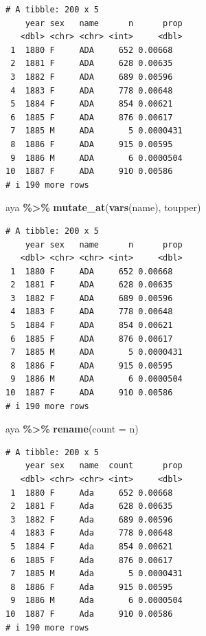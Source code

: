 \documentclass[
]{book}
\newenvironment{Shaded}{\begin{snugshade}}{\end{snugshade}}
\newcommand{\AttributeTok}[1]{\textcolor[rgb]{0.13,0.29,0.53}{#1}}
\newcommand{\FunctionTok}[1]{\textcolor[rgb]{0.13,0.29,0.53}{\textbf{#1}}}
\newcommand{\NormalTok}[1]{#1}
\newcommand{\SpecialCharTok}[1]{\textcolor[rgb]{0.81,0.36,0.00}{\textbf{#1}}}
\begin{document}
\begin{verbatim}
# A tibble: 200 x 5
    year sex   name      n      prop
   <dbl> <chr> <chr> <int>     <dbl>
 1  1880 F     ADA     652 0.00668  
 2  1881 F     ADA     628 0.00635  
 3  1882 F     ADA     689 0.00596  
 4  1883 F     ADA     778 0.00648  
 5  1884 F     ADA     854 0.00621  
 6  1885 F     ADA     876 0.00617  
 7  1885 M     ADA       5 0.0000431
 8  1886 F     ADA     915 0.00595  
 9  1886 M     ADA       6 0.0000504
10  1887 F     ADA     910 0.00586  
# i 190 more rows
\end{verbatim}

\begin{Shaded}
\begin{Highlighting}[]
\NormalTok{aya }\SpecialCharTok{\%\textgreater{}\%} \FunctionTok{mutate\_at}\NormalTok{(}\FunctionTok{vars}\NormalTok{(name), toupper)}
\end{Highlighting}
\end{Shaded}

\begin{verbatim}
# A tibble: 200 x 5
    year sex   name      n      prop
   <dbl> <chr> <chr> <int>     <dbl>
 1  1880 F     ADA     652 0.00668  
 2  1881 F     ADA     628 0.00635  
 3  1882 F     ADA     689 0.00596  
 4  1883 F     ADA     778 0.00648  
 5  1884 F     ADA     854 0.00621  
 6  1885 F     ADA     876 0.00617  
 7  1885 M     ADA       5 0.0000431
 8  1886 F     ADA     915 0.00595  
 9  1886 M     ADA       6 0.0000504
10  1887 F     ADA     910 0.00586  
# i 190 more rows
\end{verbatim}

\begin{Shaded}
\begin{Highlighting}[]
\NormalTok{aya }\SpecialCharTok{\%\textgreater{}\%} \FunctionTok{rename}\NormalTok{(}\AttributeTok{count =}\NormalTok{ n)}
\end{Highlighting}
\end{Shaded}

\begin{verbatim}
# A tibble: 200 x 5
    year sex   name  count      prop
   <dbl> <chr> <chr> <int>     <dbl>
 1  1880 F     Ada     652 0.00668  
 2  1881 F     Ada     628 0.00635  
 3  1882 F     Ada     689 0.00596  
 4  1883 F     Ada     778 0.00648  
 5  1884 F     Ada     854 0.00621  
 6  1885 F     Ada     876 0.00617  
 7  1885 M     Ada       5 0.0000431
 8  1886 F     Ada     915 0.00595  
 9  1886 M     Ada       6 0.0000504
10  1887 F     Ada     910 0.00586  
# i 190 more rows
\end{verbatim}
\end{document}
